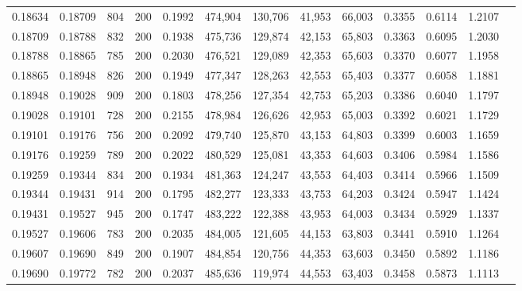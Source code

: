 \begin{tabular}{rrrrrrrrrrrrr}
0.18634 & 0.18709 &    804 & 200 &                                     0.1992 & 474,904 & 130,706 &  41,953 &  66,003 & 0.3355 & 0.6114 & 1.2107 \\
0.18709 & 0.18788 &    832 & 200 &                                     0.1938 & 475,736 & 129,874 &  42,153 &  65,803 & 0.3363 & 0.6095 & 1.2030 \\
0.18788 & 0.18865 &    785 & 200 &                                     0.2030 & 476,521 & 129,089 &  42,353 &  65,603 & 0.3370 & 0.6077 & 1.1958 \\
0.18865 & 0.18948 &    826 & 200 &                                     0.1949 & 477,347 & 128,263 &  42,553 &  65,403 & 0.3377 & 0.6058 & 1.1881 \\
0.18948 & 0.19028 &    909 & 200 &                                     0.1803 & 478,256 & 127,354 &  42,753 &  65,203 & 0.3386 & 0.6040 & 1.1797 \\
0.19028 & 0.19101 &    728 & 200 &                                     0.2155 & 478,984 & 126,626 &  42,953 &  65,003 & 0.3392 & 0.6021 & 1.1729 \\
0.19101 & 0.19176 &    756 & 200 &                                     0.2092 & 479,740 & 125,870 &  43,153 &  64,803 & 0.3399 & 0.6003 & 1.1659 \\
0.19176 & 0.19259 &    789 & 200 &                                     0.2022 & 480,529 & 125,081 &  43,353 &  64,603 & 0.3406 & 0.5984 & 1.1586 \\
0.19259 & 0.19344 &    834 & 200 &                                     0.1934 & 481,363 & 124,247 &  43,553 &  64,403 & 0.3414 & 0.5966 & 1.1509 \\
0.19344 & 0.19431 &    914 & 200 &                                     0.1795 & 482,277 & 123,333 &  43,753 &  64,203 & 0.3424 & 0.5947 & 1.1424 \\
0.19431 & 0.19527 &    945 & 200 &                                     0.1747 & 483,222 & 122,388 &  43,953 &  64,003 & 0.3434 & 0.5929 & 1.1337 \\
0.19527 & 0.19606 &    783 & 200 &                                     0.2035 & 484,005 & 121,605 &  44,153 &  63,803 & 0.3441 & 0.5910 & 1.1264 \\
0.19607 & 0.19690 &    849 & 200 &                                     0.1907 & 484,854 & 120,756 &  44,353 &  63,603 & 0.3450 & 0.5892 & 1.1186 \\
0.19690 & 0.19772 &    782 & 200 &                                     0.2037 & 485,636 & 119,974 &  44,553 &  63,403 & 0.3458 & 0.5873 & 1.1113 \\

\end{tabular}
